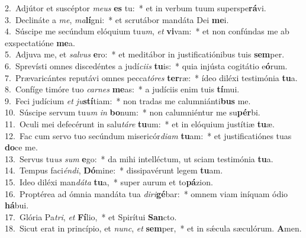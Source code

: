 {2.~}Adjútor et suscéptor \textit{me}\textit{us} \textbf{es} tu:~* et in verbum tuum superspe\textbf{rá}vi.\\
{3.~}Declináte a \textit{me}, \textit{ma}\textbf{lí}gni:~* et scrutábor mandáta Dei \textbf{me}i.\\
{4.~}Súscipe me secúndum elóquium tu\textit{um}, \textit{et} \textbf{vi}vam:~* et non confúndas me ab exspectatióne \textbf{me}a.\\
{5.~}Adjuva me, et \textit{sal}\textit{vus} \textbf{e}ro:~* et meditábor in justificatiónibus tuis \textbf{sem}per.\\
{6.~}Sprevísti omnes discedéntes a judí\textit{ci}\textit{is} \textbf{tu}is:~* quia injústa cogitátio e\textbf{ó}rum.\\
{7.~}Prævaricántes reputávi omnes pecca\textit{tó}\textit{res} \textbf{ter}ræ:~* ídeo diléxi testimónia \textbf{tu}a.\\
{8.~}Confíge timóre tuo \textit{car}\textit{nes} \textbf{me}as:~* a judíciis enim tuis \textbf{tí}mui.\\
{9.~}Feci judícium \textit{et} \textit{ju}\textbf{stí}tiam:~* non tradas me calumniánti\textbf{bus} me.\\
{10.~}Súscipe servum tu\textit{um} \textit{in} \textbf{bo}num:~* non calumniéntur me su\textbf{pér}bi.\\
{11.~}Oculi mei defecérunt in salu\textit{tá}\textit{re} \textbf{tu}um:~* et in elóquium justítiæ \textbf{tu}æ.\\
{12.~}Fac cum servo tuo secúndum misericór\textit{di}\textit{am} \textbf{tu}am:~* et justificatiónes tuas \textbf{do}ce me.\\
{13.~}Servus tu\textit{us} \textit{sum} \textbf{e}go:~* da mihi intelléctum, ut sciam testimónia \textbf{tu}a.\\
{14.~}Tempus faci\textit{én}\textit{di}, \textbf{Dó}mine:~* dissipavérunt legem \textbf{tu}am.\\
{15.~}Ideo diléxi man\textit{dá}\textit{ta} \textbf{tu}a,~* super aurum et to\textbf{pá}zion.\\
{16.~}Proptérea ad ómnia mandáta tua \textit{di}\textit{ri}\textbf{gé}bar:~* omnem viam iníquam ódio \textbf{há}bui.\\
{17.~}Glória Pa\textit{tri}, \textit{et} \textbf{Fí}lio,~* et Spirítui \textbf{San}cto.\\
{18.~}Sicut erat in princípio, et \textit{nunc}, \textit{et} \textbf{sem}per,~* et in sǽcula sæculórum. \textbf{A}men.\\
